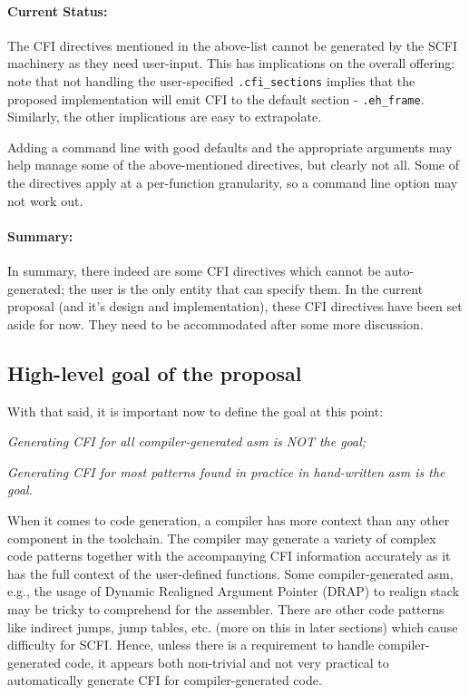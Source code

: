 \documentclass{article} \usepackage[a4paper, total={6in, 8in}]{geometry}
\begin{document}
\paragraph{Current Status:} The CFI directives mentioned in the
above-list cannot be generated by the SCFI machinery as they need user-input.
This has implications on the overall offering: note that not
handling the user-specified \texttt{.cfi\_sections} implies that the proposed
implementation will emit CFI to the default section -
\texttt{.eh\_frame}.  Similarly, the other implications are easy to
extrapolate.

Adding a command line with good defaults and the appropriate arguments may help
manage some of the above-mentioned directives, but clearly not all.  Some of
the directives apply at a per-function granularity, so a command line option
may not work out.

\paragraph{Summary:} In summary, there indeed are some CFI directives which cannot be
auto-generated; the user is the only entity that can specify them.  In the
current proposal (and it's design and implementation), these CFI directives have
been set aside for now.  They need to be accommodated after some more
discussion.

\subsection{High-level goal of the proposal}
With that said, it is important now to define the goal at this point:

\begin{center}
\emph{Generating CFI for all compiler-generated asm is NOT the goal;}

\emph{Generating CFI for most patterns found in practice in hand-written asm is the
goal.}
\end{center}

When it comes to code generation, a compiler has more context than any other
component in the toolchain.  The compiler may generate a variety of complex
code patterns together with the accompanying CFI information accurately as it
has the full context of the user-defined functions. Some compiler-generated
asm, e.g., the usage of Dynamic Realigned Argument Pointer (DRAP) to realign
stack may be tricky to comprehend for the assembler.  There are other code
patterns like indirect jumps, jump tables, etc. (more on this in later
sections) which cause difficulty for SCFI.  Hence, unless there is a
requirement to handle compiler-generated code, it appears both non-trivial and
not very practical to automatically generate CFI for compiler-generated code.
\end{document}
